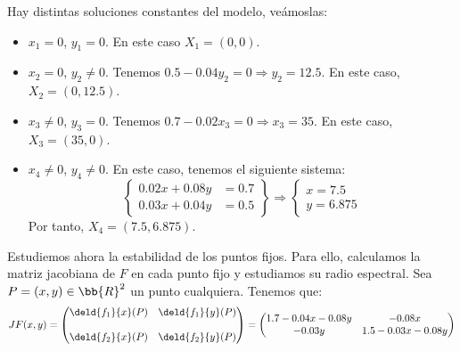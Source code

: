 \begin{ejercicio}
\begin{enumerate}
    Hay distintas soluciones constantes del modelo, veámoslas:
    \begin{itemize}
        \item $x_1=0$, $y_1=0$. En este caso $X_1=(0,0)$.
        \item $x_2=0$, $y_2\neq 0$. Tenemos $0.5-0.04y_2=0\Longrightarrow y_2=12.5$.
        En este caso, $X_2=(0,12.5)$.
        \item $x_3\neq 0$, $y_3=0$. Tenemos $0.7-0.02x_3=0\Longrightarrow x_3=35$.
        En este caso, $X_3=(35,0)$.
        \item $x_4\neq 0$, $y_4\neq 0$. En este caso, tenemos el siguiente sistema:
        \begin{equation*}
            \left\{
                \begin{array}{lr}
                    0.02x + 0.08y &=0.7\\
                    0.03x + 0.04y &=0.5
                \end{array}
            \right\}
            \Longrightarrow
            \left\{
                \begin{array}{l}
                    x=7.5\\
                    y=6.875
                \end{array}
            \right.
        \end{equation*}
        Por tanto, $X_4=(7.5,6.875)$.
    \end{itemize}

    Estudiemos ahora la estabilidad de los puntos fijos. Para ello,
    calculamos la matriz jacobiana de $F$ en cada punto fijo y estudiamos
    su radio espectral. Sea $P=(x,y)\in \bb{R}^2$ un punto cualquiera. Tenemos que:
    \begin{equation*}
        JF(x,y) = \begin{pmatrix}
            \deld{f_1}{x}(P) & \deld{f_1}{y}(P)\\ \\
            \deld{f_2}{x}(P) & \deld{f_2}{y}(P)
        \end{pmatrix}
        = \begin{pmatrix}
            1.7-0.04x-0.08y & -0.08x\\
            -0.03y & 1.5-0.03x-0.08y
        \end{pmatrix}
    \end{equation*}


\end{enumerate}
\end{ejercicio}
